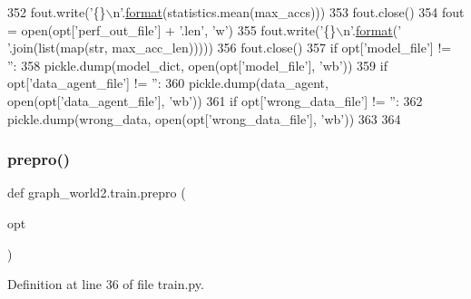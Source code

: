 \begin{DoxyCode}
352         fout.write(\textcolor{stringliteral}{'\{\}\(\backslash\)n'}.\hyperlink{namespaceparlai_1_1chat__service_1_1services_1_1messenger_1_1shared__utils_a32e2e2022b824fbaf80c747160b52a76}{format}(statistics.mean(max\_accs)))
353         fout.close()
354         fout = open(opt[\textcolor{stringliteral}{'perf\_out\_file'}] + \textcolor{stringliteral}{'.len'}, \textcolor{stringliteral}{'w'})
355         fout.write(\textcolor{stringliteral}{'\{\}\(\backslash\)n'}.\hyperlink{namespaceparlai_1_1chat__service_1_1services_1_1messenger_1_1shared__utils_a32e2e2022b824fbaf80c747160b52a76}{format}(\textcolor{stringliteral}{' '}.join(list(map(str, max\_acc\_len)))))
356         fout.close()
357     \textcolor{keywordflow}{if} opt[\textcolor{stringliteral}{'model\_file'}] != \textcolor{stringliteral}{''}:
358         pickle.dump(model\_dict, open(opt[\textcolor{stringliteral}{'model\_file'}], \textcolor{stringliteral}{'wb'}))
359     \textcolor{keywordflow}{if} opt[\textcolor{stringliteral}{'data\_agent\_file'}] != \textcolor{stringliteral}{''}:
360         pickle.dump(data\_agent, open(opt[\textcolor{stringliteral}{'data\_agent\_file'}], \textcolor{stringliteral}{'wb'}))
361     \textcolor{keywordflow}{if} opt[\textcolor{stringliteral}{'wrong\_data\_file'}] != \textcolor{stringliteral}{''}:
362         pickle.dump(wrong\_data, open(opt[\textcolor{stringliteral}{'wrong\_data\_file'}], \textcolor{stringliteral}{'wb'}))
363 
364 
\end{DoxyCode}
\mbox{\label{namespacegraph__world2_1_1train_ac238655ccbc748146d1cbaaac96433a5}} 
\subsubsection{\texorpdfstring{prepro()}{prepro()}}
{\footnotesize\ttfamily def graph\+\_\+world2.\+train.\+prepro (\begin{DoxyParamCaption}\item[{}]{opt }\end{DoxyParamCaption})}



Definition at line 36 of file train.\+py.


